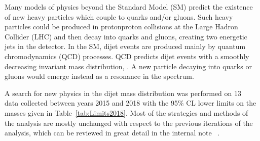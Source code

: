 

Many models of physics beyond the Standard Model (SM) predict the existence of new heavy particles which couple to quarks and/or gluons.
Such heavy particles could be produced in proton\text{--}proton collisions at the Large Hadron Collider (LHC) and then decay into quarks and 
gluons, creating two energetic jets in the detector. In the SM, dijet events are produced mainly by quantum chromodynamics (QCD) processes. QCD 
predicts dijet events with a smoothly decreasing invariant mass distribution, \mjj. A new particle decaying into quarks or gluons would emerge 
instead as a resonance in the \mjj spectrum.

A search for new physics in the dijet mass distribution was performed on 13~\TeV\xspace data collected between years 2015 and 2018 \cite{Aad:2019hjw}
 with the  95\% CL lower limits on the masses given in Table~\ref{tab:Limits2018}. 
Most of the strategies and methods of the analysis are mostly unchanged with respect to the previous iterations of the analysis,
which can be reviewed in great detail in the internal note ~\cite{Nishu:2646455}.



